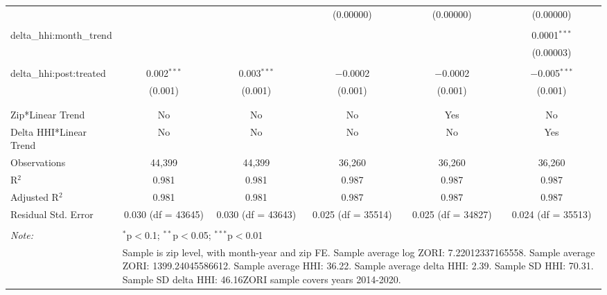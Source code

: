 \begin{table}[H]
{\begin{tabular}{@{\extracolsep{5pt}}lccccc}
   &  &  & (0.00000) & (0.00000) & (0.00000) \\  

   & & & & & \\  

  delta\_hhi:month\_trend &  &  &  &  & 0.0001$^{***}$ \\  

   &  &  &  &  & (0.00003) \\  

   & & & & & \\  

  delta\_hhi:post:treated & 0.002$^{***}$ & 0.003$^{***}$ & $-$0.0002 & $-$0.0002 & $-$0.005$^{***}$ \\  

   & (0.001) & (0.001) & (0.001) & (0.001) & (0.001) \\  

   & & & & & \\  

 \hline \\[-1.8ex]  

 Zip*Linear Trend & No & No & No & Yes & No \\  

 Delta HHI*Linear Trend & No & No & No & No & Yes \\  

 Observations & 44,399 & 44,399 & 36,260 & 36,260 & 36,260 \\  

 R$^{2}$ & 0.981 & 0.981 & 0.987 & 0.987 & 0.987 \\  

 Adjusted R$^{2}$ & 0.981 & 0.981 & 0.987 & 0.987 & 0.987 \\  

 Residual Std. Error & 0.030 (df = 43645) & 0.030 (df = 43643) & 0.025 (df = 35514) & 0.025 (df = 34827) & 0.024 (df = 35513) \\  

 \hline  

 \hline \\[-1.8ex]  

 \textit{Note:}  & \multicolumn{5}{l}{$^{*}$p$<$0.1; $^{**}$p$<$0.05; $^{***}$p$<$0.01} \\  

  & \multicolumn{5}{l}{Sample is zip level, with month-year and zip FE. Sample average log ZORI: 7.22012337165558. Sample average ZORI: 1399.24045586612. Sample average HHI: 36.22. Sample average delta HHI: 2.39. Sample SD HHI: 70.31. Sample SD delta HHI: 46.16ZORI sample covers years 2014-2020.} \\  

 \end{tabular}}  

 \end{table}  

